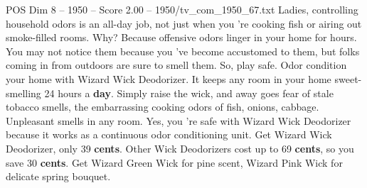 \begin{textsample}{POS Dim 8 – 1950 – Score 2.00 – 1950/tv\_com\_1950\_67.txt}  \label{ex:f8_pos_011}
Ladies, controlling household odors is an all-day job, not just when you 're cooking fish or airing out smoke-filled rooms.
Why?
Because offensive odors linger in your home for hours.
You may not notice them because you 've become accustomed to them, but folks coming in from outdoors are sure to smell them.
So, play safe.
Odor condition your home with Wizard Wick Deodorizer.
It keeps any room in your home sweet-smelling 24 hours a \textbf{day}.
Simply raise the wick, and away goes fear of stale tobacco smells, the embarrassing cooking odors of fish, onions, cabbage.
Unpleasant smells in any room.
Yes, you 're safe with Wizard Wick Deodorizer because it works as a continuous odor conditioning unit.
Get Wizard Wick Deodorizer, only 39 \textbf{cents}.
Other Wick Deodorizers cost up to 69 \textbf{cents}, so you save 30 \textbf{cents}.
Get Wizard Green Wick for pine scent, Wizard Pink Wick for delicate spring bouquet.

\end{textsample}
